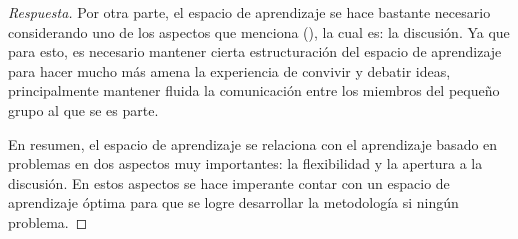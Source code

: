 \begin{enumerate}
\begin{proof}[Respuesta]
        Por otra parte, el espacio de aprendizaje se hace bastante necesario considerando uno de los aspectos que menciona \citeauthor{poot2013retos} (\citeyear{poot2013retos}), la cual es: la discusión. Ya que para esto, es necesario mantener cierta estructuración del espacio de aprendizaje para hacer mucho más amena la experiencia de convivir y debatir ideas, principalmente mantener fluida la comunicación entre los miembros del pequeño grupo al que se es parte. 

        En resumen, el espacio de aprendizaje se relaciona con el aprendizaje basado en problemas en dos aspectos muy importantes: la flexibilidad y la apertura a la discusión. En estos aspectos se hace imperante contar con un espacio de aprendizaje óptima para que se logre desarrollar la metodología si ningún problema. 

    \end{proof}
\end{enumerate}





